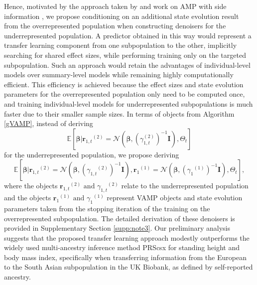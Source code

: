 Hence, motivated by the approach taken by \cite{BridgePRS} and work on AMP with side information \cite{AMP_side_info}, we propose conditioning on an additional state evolution result from the overrepresented population when constructing denoisers for the underrepresented population. A predictor obtained in this way would represent a transfer learning component from one subpopulation to the other, implicitly searching for shared effect sizes, while performing training only on the targeted subpopulation. Such an approach would retain the advantages of individual-level models over summary-level models while remaining highly computationally efficient. This efficiency is achieved because the effect sizes and state evolution parameters for the overrepresented population only need to be computed once, and training individual-level models for underrepresented subpopulations is much faster due to their smaller sample sizes.
In terms of objects from Algorithm \ref{gVAMP}, instead of deriving 
\begin{equation}
    \mathbb{E}[\bm{\beta}|{{\bm{r}_{1,t}}^{(2)}} = \mathcal{N}(\bm{\beta}, (\gamma_{1,t}^{(2)})^{-1} \bm{I}), \Theta_{t}]
\end{equation}
for the underrepresented population, we propose deriving 
\begin{equation}
    \mathbb{E}[\bm{\beta} | {\bm{r}_{1,t}}^{(2)} = \mathcal{N}(\bm{\beta}, ({\gamma_{1,t}}^{(2)})^{-1} \bm{I}), {{\bm{r}_1}^{(1)}} = \mathcal{N}(\bm{\beta}, ({\gamma_{1}}^{(1)})^{-1} \bm{I}), \Theta_{t}],
\end{equation}
where the objects ${\bm{r}_{1,t}}^{(2)} \text{ and } {\gamma_{1,t}}^{(2)}$ relate to the underrepresented population and the objects ${{\bm{r}_1}^{(1)}} \text{ and } {\gamma_{1}}^{(1)}$ represent VAMP objects and state evolution parameters taken from the stopping iteration of the training on the overrepresented subpopulation. The detailed derivation of these denoisers is provided in Supplementary Section \ref{supp:note3}. Our preliminary analysis suggests that the proposed transfer learning approach modestly outperforms the widely used multi-ancestry inference method PRScsx \cite{prscsx} for standing height and body mass index, specifically when transferring information from the European to the South Asian subpopulation in the UK Biobank, as defined by self-reported ancestry.

